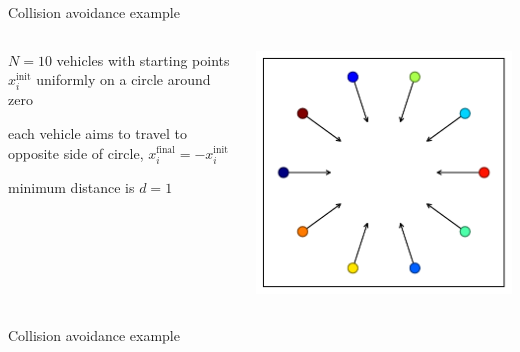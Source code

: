 \documentclass[aspectratio=169,11pt]{beamer}
\begin{document}
\begin{frame}{Collision avoidance example}
\begin{columns}
\begin{column}{0.7\textwidth}
\BIT
\item $N = 10$ vehicles with starting points $x^\text{init}_i$ uniformly on a circle around zero
\item each vehicle aims to travel to opposite side of circle, $x^\text{final}_i = -x^\text{init}_i$
\item minimum distance is $d=1$
\EIT
\end{column}
\begin{column}{0.3\textwidth}
\includegraphics[width=\textwidth]{collision_avoidance_setting.pdf}
\end{column}
\end{columns}
\end{frame}

\begin{frame}{Collision avoidance example}
\centering
{}
\end{frame}
\end{document}
